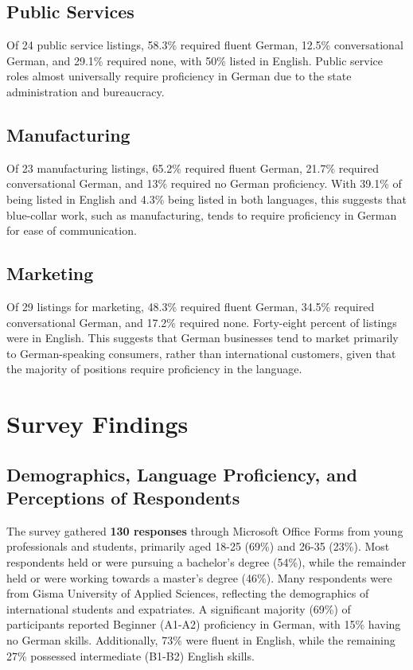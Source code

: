 \subsection{Public Services}
Of 24 public service listings, 58.3\% required fluent German, 12.5\% conversational German, and 29.1\% required none, with 50\% listed in English. Public service roles almost universally require proficiency in German due to the state administration and bureaucracy.   

\subsection{Manufacturing}
Of 23 manufacturing listings, 65.2\% required fluent German, 21.7\% required conversational German, and 13\% required no German proficiency. With 39.1\% of being listed in English and 4.3\% being listed in both languages, this suggests that blue-collar work, such as manufacturing, tends to require proficiency in German for ease of communication.

\subsection{Marketing}
Of 29 listings for marketing, 48.3\% required fluent German, 34.5\% required conversational German, and 17.2\% required none. Forty-eight percent of listings were in English. This suggests that German businesses tend to market primarily to German-speaking consumers, rather than international customers, given that the majority of positions require proficiency in the language.

\section{Survey Findings}
\vspace{5pt}
\subsection{Demographics, Language Proficiency, and Perceptions of Respondents}
The survey gathered \textbf{130 responses} through Microsoft Office Forms from young professionals and students, primarily aged 18-25 (69\%) and 26-35 (23\%). Most respondents held or were pursuing a bachelor’s degree (54\%), while the remainder held or were working towards a master’s degree (46\%). Many respondents were from Gisma University of Applied Sciences, reflecting the demographics of international students and expatriates. A significant majority (69\%) of participants reported Beginner (A1-A2) proficiency in German, with 15\% having no German skills. Additionally, 73\% were fluent in English, while the remaining 27\% possessed intermediate (B1-B2) English skills.

